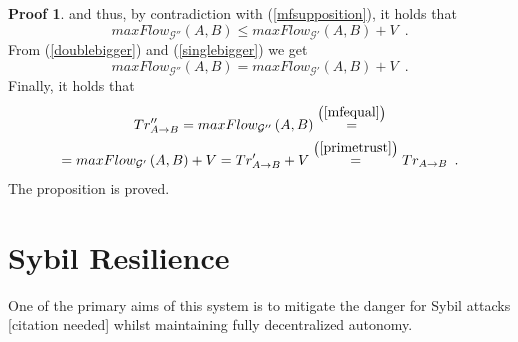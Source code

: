\documentclass[11pt]{llncs}
\theoremstyle{definition}
\newtheorem{sepproof}{Proof}
\begin{document}
\begin{sepproof}
        and thus, by contradiction with (\ref{mfsupposition}), it holds that
        \begin{equation}
        \label{singlebigger}
           maxFlow_{\mathcal{G}''}\left(A, B\right) \leq maxFlow_{\mathcal{G}'}\left(A, B\right) + V \enspace.
        \end{equation}
        From (\ref{doublebigger}) and (\ref{singlebigger}) we get
        \begin{equation}
        \label{mfequal}
           maxFlow_{\mathcal{G}''}\left(A, B\right) = maxFlow_{\mathcal{G}'}\left(A, B\right) + V \enspace.
        \end{equation}
        Finally, it holds that
        \begin{equation}
        \begin{gathered}
           Tr''_{A \rightarrow B} = maxFlow_{\mathcal{G}''}\left(A, B\right) \overset{\left(\ref{mfequal}\right)}{=} \\
           = maxFlow_{\mathcal{G}'}\left(A, B\right) + V = Tr'_{A \rightarrow B} + V
           \overset{\left(\ref{primetrust}\right)}{=} Tr_{A \rightarrow B} \enspace.
        \end{gathered}
        \end{equation}
        The proposition is proved.
     \end{sepproof}
  \section{Sybil Resilience}
     One of the primary aims of this system is to mitigate the danger for Sybil attacks [citation needed] whilst maintaining
     fully decentralized autonomy.
\end{document}

